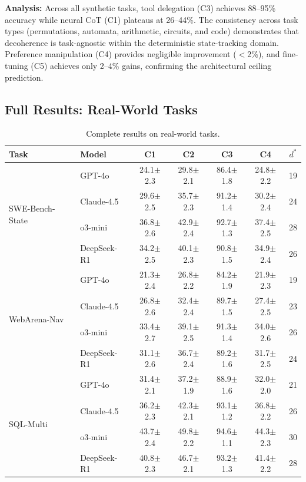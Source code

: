 \documentclass{article}
\theoremstyle{plain}
\theoremstyle{definition}
\theoremstyle{remark}
\begin{document}
\textbf{Analysis:} Across all synthetic tasks, tool delegation (C3) achieves 88--95\% accuracy while neural CoT (C1) plateaus at 26--44\%. The consistency across task types (permutations, automata, arithmetic, circuits, and code) demonstrates that decoherence is task-agnostic within the deterministic state-tracking domain. Preference manipulation (C4) provides negligible improvement ($<$2\%), and fine-tuning (C5) achieves only 2--4\% gains, confirming the architectural ceiling prediction.

\subsection{Full Results: Real-World Tasks}

\begin{table}[h]
\centering
\caption{Complete results on real-world tasks.}
\label{tab:results_realworld}
\small
\begin{tabular}{@{}llccccc@{}}
\toprule
\textbf{Task} & \textbf{Model} & \textbf{C1} & \textbf{C2} & \textbf{C3} & \textbf{C4} & \textbf{$d^*$} \\
\midrule
\multirow{4}{*}{SWE-Bench-State}
& GPT-4o & 24.1$\pm$2.3 & 29.8$\pm$2.1 & 86.4$\pm$1.8 & 24.8$\pm$2.2 & 19 \\
& Claude-4.5 & 29.6$\pm$2.5 & 35.7$\pm$2.3 & 91.2$\pm$1.4 & 30.2$\pm$2.4 & 24 \\
& o3-mini & 36.8$\pm$2.6 & 42.9$\pm$2.4 & 92.7$\pm$1.3 & 37.4$\pm$2.5 & 28 \\
& DeepSeek-R1 & 34.2$\pm$2.5 & 40.1$\pm$2.3 & 90.8$\pm$1.5 & 34.9$\pm$2.4 & 26 \\
\midrule
\multirow{4}{*}{WebArena-Nav}
& GPT-4o & 21.3$\pm$2.4 & 26.8$\pm$2.2 & 84.2$\pm$1.9 & 21.9$\pm$2.3 & 19 \\
& Claude-4.5 & 26.8$\pm$2.6 & 32.4$\pm$2.4 & 89.7$\pm$1.5 & 27.4$\pm$2.5 & 23 \\
& o3-mini & 33.4$\pm$2.7 & 39.1$\pm$2.5 & 91.3$\pm$1.4 & 34.0$\pm$2.6 & 26 \\
& DeepSeek-R1 & 31.1$\pm$2.6 & 36.7$\pm$2.4 & 89.2$\pm$1.6 & 31.7$\pm$2.5 & 24 \\
\midrule
\multirow{4}{*}{SQL-Multi}
& GPT-4o & 31.4$\pm$2.1 & 37.2$\pm$1.9 & 88.9$\pm$1.6 & 32.0$\pm$2.0 & 21 \\
& Claude-4.5 & 36.2$\pm$2.3 & 42.3$\pm$2.1 & 93.1$\pm$1.2 & 36.8$\pm$2.2 & 26 \\
& o3-mini & 43.7$\pm$2.4 & 49.8$\pm$2.2 & 94.6$\pm$1.1 & 44.3$\pm$2.3 & 30 \\
& DeepSeek-R1 & 40.8$\pm$2.3 & 46.7$\pm$2.1 & 93.2$\pm$1.3 & 41.4$\pm$2.2 & 28 \\
\bottomrule
\end{tabular}
\end{table}
\end{document}
